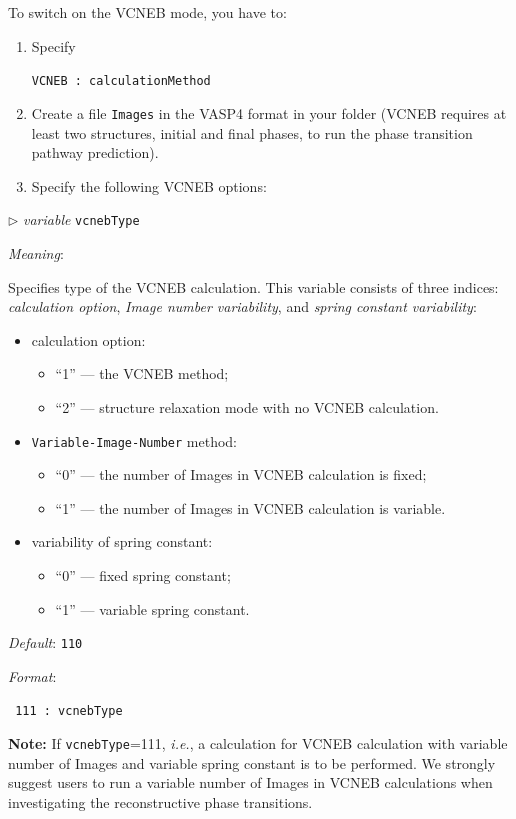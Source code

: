 \documentclass[12pt]{article}
\newcommand{\keyword}[1]{\texttt{#1}}
\newcommand{\file}[1]{\texttt{#1}}
\newcommand{\paramacro}[6]{
\vspace{0.5cm}
$\triangleright$ \emph{variable} {\color{blue} \texttt{#1}}

\emph{Meaning}: {#2}

{#3}

\emph{Default}: \texttt{#4}

\emph{Format}:

{\addtolength{\leftskip}{10mm} 
\texttt{#5}
\par}


{\small #6}

}
\begin{document}
To switch on the VCNEB mode, you have to:

\begin{enumerate}
  \item Specify

  \texttt{VCNEB  : calculationMethod}
  
  \item Create a file \file{Images} in the VASP4 format in your folder (VCNEB
  requires at least two structures, initial and final phases, to run the phase
  transition pathway prediction).
  
  \item Specify the following VCNEB options:
\end{enumerate}


\paramacro{vcnebType}{Specifies type of the VCNEB calculation. This variable
consists of three indices: \emph{calculation option}, \emph{Image number
variability}, and \emph{spring constant variability}:
\begin{itemize}
  \item calculation option:
  \begin{itemize}
    \item[] ``1'' --- the VCNEB method;
    \item[] ``2'' --- structure relaxation mode with no VCNEB calculation.
  \end{itemize}
  \item \texttt{Variable-Image-Number} method:
  \begin{itemize}
    \item[] ``0'' ---  the number of Images in VCNEB calculation is fixed;
    \item[] ``1'' ---  the number of Images in VCNEB calculation is variable.
  \end{itemize}
  \item variability of spring constant:
  \begin{itemize}
    \item[] ``0'' --- fixed spring constant;
    \item[] ``1'' --- variable spring constant.
  \end{itemize}
\end{itemize}
}{}{110}{
111    : vcnebType
}{\textbf{Note:} If \keyword{vcnebType}=111, \emph{i.e.}, a calculation for
VCNEB calculation with variable number of Images and variable spring constant is
to be performed. We strongly suggest users to run a variable number of Images in
VCNEB calculations when investigating the reconstructive phase transitions.}
\end{document}

